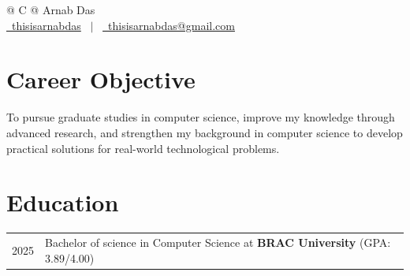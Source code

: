 \documentclass[a4paper,12pt]{article}
\begin{document}
\pagestyle{empty} 



\begin{tabularx}{\linewidth}{@{} C @{}}
\Huge{Arnab Das} \\[7.5pt]
\href{https://github.com/thisisarnabdas}{\raisebox{-0.05\height}\faGithub\ thisisarnabdas} \ $|$ \ 
\href{mailto:thisisarnabdas@gmail.com}{\raisebox{-0.05\height}\faEnvelope \ thisisarnabdas@gmail.com} \\
\end{tabularx}


\section{Career Objective}
To pursue graduate studies in computer science, improve my knowledge through advanced research, and strengthen my background in computer science to develop practical solutions for real-world technological problems.

\section{Education}
\begin{tabularx}{\linewidth}{@{}l X@{}}	

2025 & Bachelor of science in Computer Science at \textbf{BRAC University} \hfill (GPA: 3.89/4.00) \\ 

\end{tabularx}
\end{document}
